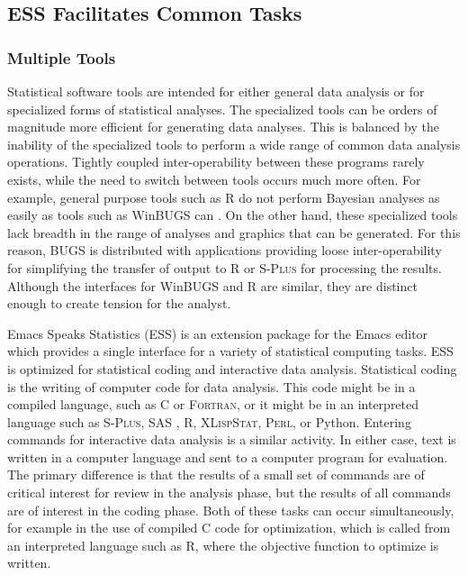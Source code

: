 \documentclass{article}
\newcommand*{\SAS}{\textsc{SAS}{\textregistered} }
\newcommand*{\Splus}{\textsc{S-Plus}}
\newcommand*{\XLispStat}{\textsc{XLispStat}}
\newcommand*{\Perl}{\textsc{Perl}}
\newcommand*{\Fortran}{\textsc{Fortran}}
\begin{document}
\subsection{ESS Facilitates Common Tasks}
\label{sec:ess-facil-comm}

\subsubsection{Multiple Tools}
\label{sec:multiple-tools}

Statistical software tools are intended for either general data
analysis or for specialized forms of statistical analyses.  The
specialized tools can be orders of magnitude more efficient for
generating data analyses.  This is balanced by the inability of the
specialized tools to perform a wide range of common data analysis
operations.  Tightly coupled inter-operability between these programs
rarely exists, while the need to switch between tools occurs much more
often.  For example, general purpose tools such as R
\citep{ihak:gent:1996} do not perform Bayesian analyses as easily as
tools such as WinBUGS can \citep{SpieThomBest:1999}.  On the other
hand, these specialized tools lack breadth in the range of analyses
and graphics that can be generated.  For this reason, BUGS is
distributed with applications providing loose inter-operability for
simplifying the transfer of output to R or \Splus{} for processing the
results.  Although the interfaces for WinBUGS and R are similar, they
are distinct enough to create tension for the analyst.

Emacs Speaks Statistics (ESS) \citep{ESS} is an extension package for
the Emacs editor which provides a single interface for a variety of
statistical computing tasks.  ESS is optimized for statistical coding
and interactive data analysis.  Statistical coding is the writing of
computer code for data analysis.  This code might be in a compiled
language, such as C or \Fortran, or it might be in an interpreted
language such as \Splus, \SAS, R, \XLispStat, \Perl, or Python.
Entering commands for interactive data analysis is a similar activity.
In either case, text is written in a computer language and sent to a
computer program for evaluation.  The primary difference is that the
results of a small set of commands are of critical interest for review
in the analysis phase, but the results of all commands are of interest
in the coding phase.  Both of these tasks can occur simultaneously,
for example in the use of compiled C code for optimization, which is
called from an interpreted language such as R, where the objective
function to optimize is written.
\end{document}
